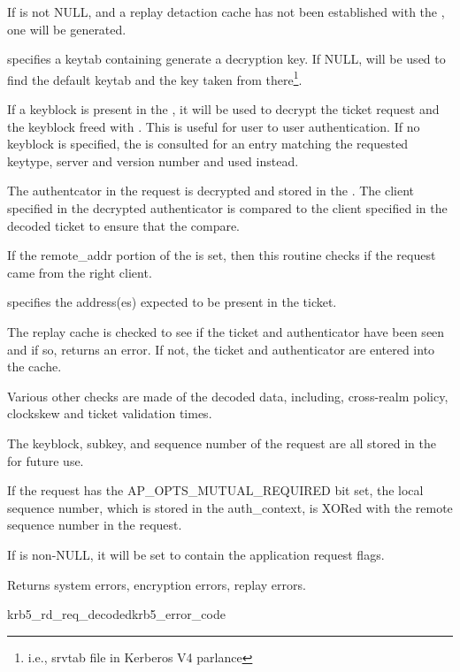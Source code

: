 If  is not NULL, and a replay detaction cache has not been
established with the , one will be generated. 

 specifies a keytab containing generate a decryption key. If
NULL,  will be used to find the default 
keytab and the key taken from there\footnote{i.e., srvtab file in
Kerberos V4 parlance}.


If a keyblock is present in the , it will be
used to decrypt the ticket request and the keyblock freed with
. This is useful for user to user
authentication. If no keyblock is specified, the  is
consulted for an entry matching the requested keytype, server and
version number and used instead.

The authentcator in the request is decrypted and stored in the
. The client specified in the decrypted
authenticator is compared to the client specified in the decoded ticket
to ensure that the compare.

If the remote_addr portion of the  is set, 
then this routine checks if the request came from the right client.

 specifies the address(es) expected to be present
in the ticket.

The replay cache is checked to see if the ticket and authenticator have
been seen and if so, returns an error. If not, the ticket and
authenticator are entered into the cache.

Various other checks are made of the decoded data, including,
cross-realm policy, clockskew and ticket validation times.

The keyblock, subkey, and sequence number of the request are all stored
in the  for future use.

If the request has the AP_OPTS_MUTUAL_REQUIRED bit set, the local
sequence number, which is stored in the auth_context, is XORed with the
remote sequence number in the request.

If  is non-NULL, it will be set to contain the
application request flags.

Returns system errors, encryption errors, replay errors.

\begin{funcdecl}{krb5_rd_req_decoded}{krb5_error_code}{\funcinout}
\funcin
{}
\funcinout
{}
\funcout
{}
\end{funcdecl}

